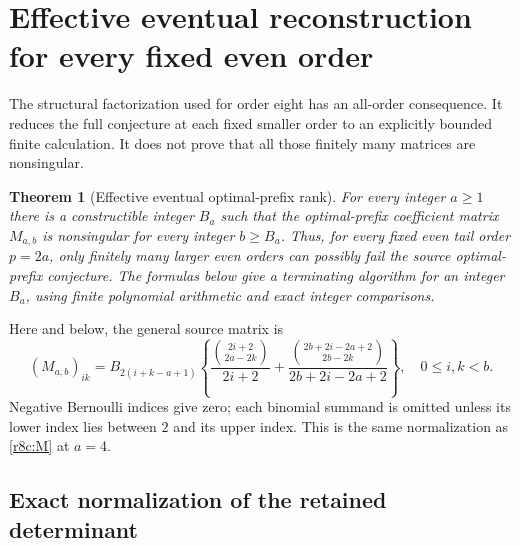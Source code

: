 \documentclass[11pt,a4paper]{article}
\numberwithin{equation}{section}
\theoremstyle{plain}
\newtheorem{theorem}{Theorem}[section]
\theoremstyle{definition}
\theoremstyle{remark}
\begin{document}


\section{Effective eventual reconstruction for every fixed even order}
\label{ert:section}

The structural factorization used for order eight has an all-order
consequence. It reduces the full conjecture at each fixed smaller
order to an explicitly bounded finite calculation. It does not prove
that all those finitely many matrices are nonsingular.

\begin{theorem}[Effective eventual optimal-prefix rank]
\label{ert:main}
For every integer $a\ge1$ there is a constructible integer $B_a$
such that the optimal-prefix coefficient matrix $M_{a,b}$ is
nonsingular for every integer $b\ge B_a$. Thus, for every fixed
even tail order $p=2a$, only finitely many larger even orders can
possibly fail the source optimal-prefix conjecture. The formulas
below give a terminating algorithm for an integer $B_a$, using
finite polynomial arithmetic and exact integer comparisons.
\end{theorem}

Here and below, the general source matrix is
\begin{equation}\label{ert:M}
 (M_{a,b})_{ik}=B_{2(i+k-a+1)}
 \left\{\frac{\binom{2i+2}{2a-2k}}{2i+2}
 +\frac{\binom{2b+2i-2a+2}{2b-2k}}{2b+2i-2a+2}\right\},
 \quad0\le i,k<b.
\end{equation}
Negative Bernoulli indices give zero; each binomial summand is
omitted unless its lower index lies between $2$ and its upper index.
This is the same normalization as \eqref{r8c:M} at $a=4$.

\subsection{Exact normalization of the retained determinant}
\end{document}
